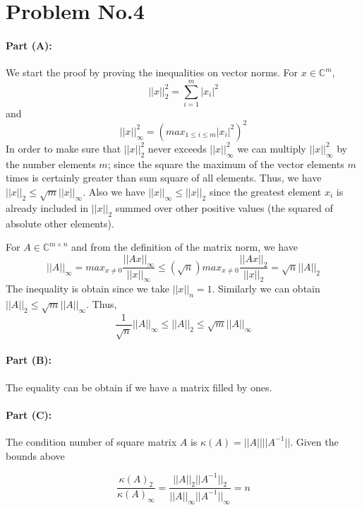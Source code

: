 \section*{Problem No.4} \label{sec:prob4}
\paragraph{Part (A):} We start the proof by proving the inequalities on vector norms. For $x \in \mathbb{C}^{m}$, 
\[
||x||_{2}^{2} = \sum_{i=1}^{m} |x_{i}|^{2} 
\]
and 
\[
||x||_{\infty}^{2} = (max_{1\leq i \leq m} |x_{i}|^{2})^{2}
\]
In order to make sure that $||x||_{2}^{2}$ never exceeds $||x||_{\infty}^{2}$ we can multiply $||x||_{\infty}^{2}$ by the number elements $m$; since the square the maximum of the vector elements $m$ times is certainly greater than sum square of all elements. Thus, we have $||x||_{2} \leq \sqrt{m}||x||_{\infty}$. Also we have
$ ||x||_{\infty} \leq ||x||_{2}$ since the greatest element $x_{i}$ is already included in $||x||_{2}$ summed over other positive values (the squared of absolute other elements).

For $A \in \mathbb{C}^{m \times n}$ and from the definition of the matrix norm, we have 
\[
||A||_{\infty} = max_{x\neq 0}\frac{||Ax||_{\infty}}{||x||_{\infty}}\leq
 (\sqrt{n}) max_{x\neq 0}\frac{||Ax||_{2}}{||x||_{2}} = \sqrt{n} ||A||_{2}
\]
The inequality is obtain since we take $||x||_{n}=1$. Similarly we can obtain $||A||_{2}\leq \sqrt{m}|| A||_{\infty}$. Thus,
\[
 \frac{1}{\sqrt{n}}|| A||_{\infty} \leq ||A||_{2} \leq \sqrt{m}|| A||_{\infty}
\]

\paragraph{Part (B):} The equality can be obtain if we have a matrix filled by ones.

\paragraph{ Part (C):} The condition number of square matrix $A$ is $\kappa(A) = ||A||||A^{-1}||$. Given the bounds above

\[
\frac{\kappa(A)_{2}}{\kappa(A)_{\infty}} = \frac{||A||_{2}||A^{-1}||_{2}}{||A||_{\infty}||A^{-1}||_{\infty}} = n
\]